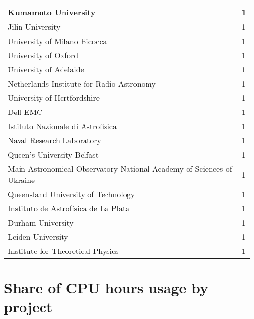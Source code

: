 \documentclass{article}%
\begin{document}
\begin{longtabu}{X[l] X[r]}
\hline%
Kumamoto University&1\\%
\hline%
Jilin University&1\\%
\hline%
University of Milano Bicocca&1\\%
\hline%
University of Oxford&1\\%
\hline%
University of Adelaide&1\\%
\hline%
Netherlands Institute for Radio Astronomy&1\\%
\hline%
University of Hertfordshire&1\\%
\hline%
Dell EMC&1\\%
\hline%
Istituto Nazionale di Astrofisica&1\\%
\hline%
Naval Research Laboratory&1\\%
\hline%
Queen's University Belfast&1\\%
\hline%
Main Astronomical Observatory National Academy of Sciences of Ukraine&1\\%
\hline%
Queensland University of Technology&1\\%
\hline%
Instituto de Astrofísica de La Plata&1\\%
\hline%
Durham University&1\\%
\hline%
Leiden University&1\\%
\hline%
Institute for Theoretical Physics&1\\%
\hline%
\end{longtabu}%
\section{Share of CPU hours usage by project}%
\end{document}
